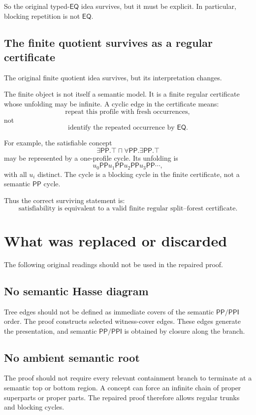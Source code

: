 \documentclass[11pt]{article}
\newcommand{\PP}{\mathsf{PP}}
\newcommand{\PPI}{\mathsf{PPI}}
\newcommand{\EQ}{\mathsf{EQ}}
\theoremstyle{definition}
\theoremstyle{plain}
\begin{document}
So the original typed-$\EQ$ idea survives, but it must be explicit.  In particular, blocking repetition is not $\EQ$.

\subsection{The finite quotient survives as a regular certificate}

The original finite quotient idea survives, but its interpretation changes.

The finite object is not itself a semantic model.  It is a finite regular certificate whose unfolding may be infinite.  A cyclic edge in the certificate means:
\[
\text{repeat this profile with fresh occurrences},
\]
not
\[
\text{identify the repeated occurrence by }\EQ.
\]

For example, the satisfiable concept
\[
\exists\PP.\top \sqcap \forall\PP.\exists\PP.\top
\]
may be represented by a one-profile cycle.  Its unfolding is
\[
u_0\PP u_1\PP u_2\PP u_3\PP\cdots,
\]
with all $u_i$ distinct.  The cycle is a blocking cycle in the finite certificate, not a semantic $\PP$ cycle.

Thus the correct surviving statement is:
\[
\boxed{\text{satisfiability is equivalent to a valid finite regular split--forest certificate.}}
\]

\section{What was replaced or discarded}

The following original readings should not be used in the repaired proof.

\subsection{No semantic Hasse diagram}

Tree edges should not be defined as immediate covers of the semantic $\PP/\PPI$ order.  The proof constructs selected witness-cover edges.  These edges generate the presentation, and semantic $\PP/\PPI$ is obtained by closure along the branch.

\subsection{No ambient semantic root}

The proof should not require every relevant containment branch to terminate at a semantic top or bottom region.  A concept can force an infinite chain of proper superparts or proper parts.  The repaired proof therefore allows regular trunks and blocking cycles.
\end{document}
